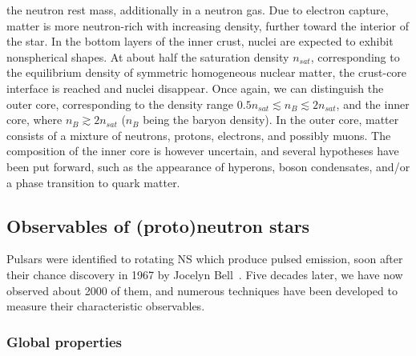 the neutron rest mass, additionally in a neutron gas. 
Due to electron capture, matter is more neutron-rich with increasing density, 
further toward the interior of the star.
In the bottom layers of the inner crust, nuclei are expected to exhibit 
nonspherical shapes.
At about half the saturation density $n_{sat}$, corresponding to the 
equilibrium density of symmetric homogeneous nuclear matter, the crust-core
interface is reached and nuclei disappear. Once again, we can distinguish the
outer core, corresponding to the density range $0.5n_{sat} \lesssim n_B 
\lesssim 2n_{sat}$, and the inner core, where $n_B \gtrsim 2n_{sat}$ ($n_B$
being the baryon density). 
In the outer core, matter consists of a mixture of neutrons, protons, 
electrons, and possibly muons. The composition of the inner core is however 
uncertain, and several hypotheses have been put forward, such as the appearance 
of hyperons, boson condensates, and/or a phase transition to quark 
matter.

\subsection*{Observables of (proto)neutron stars}

Pulsars were identified to rotating NS which produce pulsed emission, soon 
after their chance discovery in 1967 by Jocelyn Bell~\cite{Hewish1968}. Five
decades later, we have now observed about 2000 of them, and numerous techniques
have been developed to measure their characteristic observables. 

\subsubsection*{Global properties}

